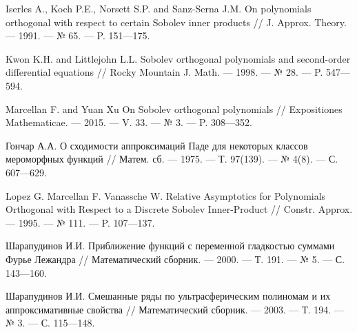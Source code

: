 \begin{thebibliography}{99}
Iserles A., Koch P.E., Norsett S.P. and Sanz-Serna J.M. On polynomials  orthogonal  with respect  to certain Sobolev inner products // J. Approx. Theory. --- 1991. --- № 65. --- P. 151---175.










Kwon K.H. and Littlejohn L.L. Sobolev orthogonal polynomials and second-order differential equations // Rocky Mountain J. Math. --- 1998. --- № 28. --- P. 547---594.










Marcellan F. and Yuan Xu On Sobolev orthogonal polynomials // Expositiones Mathematicae. --- 2015. --- V. 33. --- № 3. --- P. 308---352.










Гончар А.А. О сходимости аппроксимаций Паде для некоторых классов мероморфных функций // Матем. сб. --- 1975. --- Т. 97(139). --- № 4(8). --- С. 607---629.










Lopez G. Marcellan F. Vanassche W. Relative Asymptotics for Polynomials Orthogonal with Respect to a Discrete Sobolev Inner-Product // Constr. Approx. --- 1995. --- № 111. --- P. 107---137.









Шарапудинов И.И. Приближение функций с переменной гладкостью суммами Фурье Лежандра // Математический сборник. --- 2000. --- Т. 191. --- № 5. --- С. 143---160.










Шарапудинов И.И. Смешанные ряды по ультрасферическим полиномам и их аппроксимативные свойства // Математический сборник. --- 2003. --- Т. 194. --- № 3. --- С. 115---148.











\end{thebibliography}
